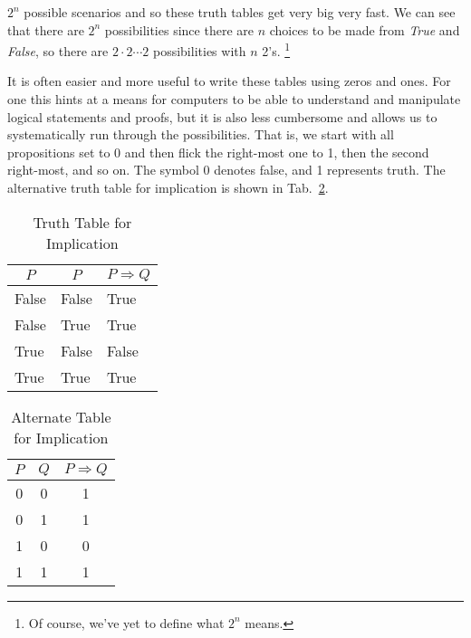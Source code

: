         $2^{n}$ possible scenarios and so these truth tables get very big very
        fast. We can see that there are $2^{n}$ possibilities since there are
        $n$ choices to be made from \textit{True} and \textit{False}, so there
        are $2\cdot{2}\cdots{2}$ possibilities with $n$ 2's.%
        \footnote{Of course, we've yet to define what $2^{n}$ means.}
        \par\hfill\par
        It is often easier and more useful to write these tables using zeros and
        ones. For one this hints at a means for computers to be able to
        understand and manipulate logical statements and proofs, but it is also
        less cumbersome and allows us to systematically run through the
        possibilities. That is, we start with all propositions set to 0 and then
        flick the right-most one to 1, then the second right-most, and so on.
        The symbol 0 denotes false, and 1 represents truth. The alternative
        truth table for implication is shown in
        Tab.~\ref{tab:Alternate_Truth_Table_Implication}.
        \par
        \begin{minipage}[b]{0.49\textwidth}
            \centering
            \begin{table}[H]
                \centering
                \captionsetup{type=table}
                \begin{tabular}{l|l|l}
                    \multicolumn{1}{c|}{$P$}&\multicolumn{1}{c|}{$P$}&
                    \multicolumn{1}{c}{$P\Rightarrow{Q}$}\\
                    \hline
                    False&False&True\\
                    False&True&True\\
                    True&False&False\\
                    True&True&True
                \end{tabular}
                \caption{Truth Table for Implication}
                \label{tab:Truth_Table_Implication}
            \end{table}
        \end{minipage}\hfill
        \begin{minipage}[b]{0.49\textwidth}
            \centering
            \begin{table}[H]
                \centering
                \captionsetup{type=table}
                \begin{tabular}{c|c|c}
                    $P$&$Q$&$P\Rightarrow{Q}$\\
                    \hline
                    0&0&1\\
                    0&1&1\\
                    1&0&0\\
                    1&1&1
                \end{tabular}
                \caption{Alternate Table for Implication}
                \label{tab:Alternate_Truth_Table_Implication}
            \end{table}
        \end{minipage}
